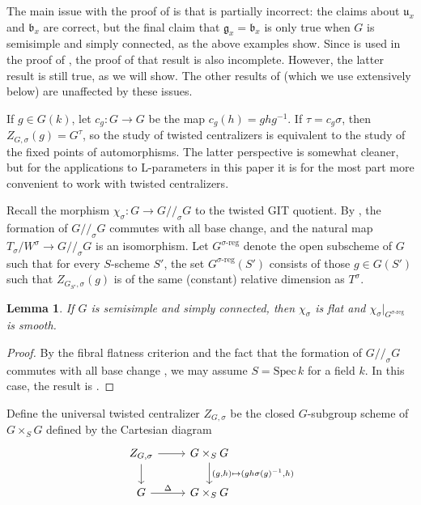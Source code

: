 \documentclass[11pt,reqno]{amsart}
\newtheorem{lemma}[theorem]{Lemma}
\theoremstyle{definition}
\renewcommand{\rm}{\mathrm}
\newcommand{\Spec}{\mathrm{Spec} \,}
\newcommand{\fb}{\mathfrak{b}}
\newcommand{\fg}{\mathfrak{g}}
\newcommand{\fu}{\mathfrak{u}}
\begin{document}
The main issue with the proof of \cite[Proposition 5.2.4(2)]{Xiao-Zhu} is that \cite[Lemma 5.2.5]{Xiao-Zhu} is partially incorrect: the claims about $\fu_x$ and $\fb_x$ are correct, but the final claim that $\fg_x = \fb_x$ is only true when $G$ is semisimple and simply connected, as the above examples show. Since \cite[Lemma 5.2.5]{Xiao-Zhu} is used in the proof of \cite[Proposition 5.2.19(4)]{Xiao-Zhu}, the proof of that result is also incomplete. However, the latter result is still true, as we will show. The other results of \cite{Xiao-Zhu} (which we use extensively below) are unaffected by these issues.

If $g \in G(k)$, let $c_g\colon G \to G$ be the map $c_g(h) = ghg^{-1}$. If $\tau = c_g \sigma$, then $Z_{G,\sigma}(g) = G^\tau$, so the study of twisted centralizers is equivalent to the study of the fixed points of automorphisms. The latter perspective is somewhat cleaner, but for the applications to L-parameters in this paper it is for the most part more convenient to work with twisted centralizers.

Recall the morphism $\chi_\sigma\colon G \to G/\!/_\sigma G$ to the twisted GIT quotient. By \cite[Theorem 3.10]{Cotner-conn-comps}, the formation of $G/\!/_\sigma G$ commutes with all base change, and the natural map $T_\sigma/W^\sigma \to G/\!/_\sigma G$ is an isomorphism. 
Let $G^{\sigma\textrm{-}\rm{reg}}$ denote the open subscheme of $G$ such that for every $S$-scheme $S'$, the set $G^{\sigma\textrm{-}\rm{reg}}(S')$ consists of those $g \in G(S')$ such that $Z_{G_{S'},\sigma}(g)$ is of the same (constant) relative dimension as $T^\sigma$.

\begin{lemma}\label{lemma:steinberg-map-flat}
    If $G$ is semisimple and simply connected, then $\chi_\sigma$ is flat and $\chi_\sigma|_{G^{\sigma\textrm{-}\rm{reg}}}$ is smooth.
\end{lemma}

\begin{proof}
    By the fibral flatness criterion and the fact that the formation of $G/\!/_\sigma G$ commutes with all base change \cite[Theorem 3.10]{Cotner-conn-comps}, we may assume $S = \Spec k$ for a field $k$. In this case, the result is \cite[Corollary 4.3.3, Corollary 5.3.3]{Xiao-Zhu}.
\end{proof}

Define the universal twisted centralizer $Z_{G,\sigma}$ be the closed $G$-subgroup scheme of $G \times_S G$ defined by the Cartesian diagram
\[
\begin{tikzcd}
    Z_{G,\sigma} \arrow[r] \arrow[d]
        &G \times_S G \arrow[d, "{(g, h) \mapsto (gh\sigma(g)^{-1}, h)}"] \\
    G \arrow[r, "\Delta"]
        &G \times_S G
\end{tikzcd}
\]
\end{document}
